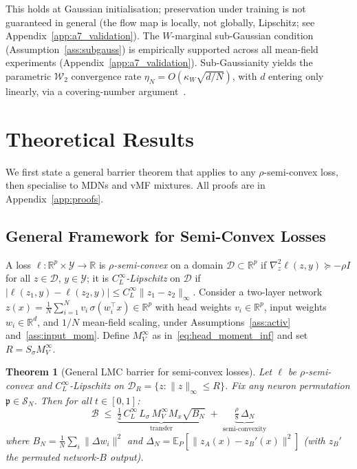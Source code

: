 \documentclass[11pt]{article}
\newtheorem{theorem}{Theorem}[section]
\newcommand{\R}{\mathbb{R}}
\newcommand{\E}{\mathbb{E}}
\newcommand{\cW}{\mathcal{W}}
\newcommand{\cS}{\mathcal{S}}
\newcommand{\cB}{\mathcal{B}}
\newcommand{\cD}{\mathcal{D}}  %
\newcommand{\cY}{\mathcal{Y}}
\newcommand{\nperm}{\mathfrak{p}}  %
\begin{document}
This holds at Gaussian initialisation; preservation under training
is not guaranteed in general (the flow map is locally, not globally,
Lipschitz; see Appendix~\ref{app:a7_validation}).
The $W$-marginal sub-Gaussian condition (Assumption~\ref{ass:subgauss})
is empirically supported across all mean-field experiments
(Appendix~\ref{app:a7_validation}).
Sub-Gaussianity yields the parametric $\cW_2$ convergence rate
$\eta_N = O(\kappa_W\sqrt{d/N})$, with $d$ entering only linearly,
via a covering-number argument~\cite{lei2020,weed2019}.

\section{Theoretical Results}\label{sec:loss_geometry}

We first state a general barrier theorem that applies to any
$\rho$-semi-convex loss, then specialise to MDNs and vMF mixtures.
All proofs are in Appendix~\ref{app:proofs}.

\subsection{General Framework for Semi-Convex Losses}
\label{sec:general_framework}

A loss $\ell:\R^p \times \cY \to \R$ is \emph{$\rho$-semi-convex}
on a domain $\cD \subset \R^p$ if
$\nabla^2_z \ell(z,y) \succeq -\rho I$ for all $z \in \cD$,
$y \in \cY$; it is \emph{$C_L^\infty$-Lipschitz} on $\cD$ if
$|\ell(z_1,y)-\ell(z_2,y)| \le C_L^\infty \|z_1-z_2\|_\infty$.
Consider a two-layer network
$z(x)=\frac{1}{N}\sum_{i=1}^N v_i\,\sigma(w_i^\top x)\in\R^p$
with head weights $v_i\in\R^p$, input weights $w_i\in\R^d$, and
$1/N$ mean-field scaling,
under Assumptions~\ref{ass:activ} and~\ref{ass:input_mom}.
Define $M_V^\infty$ as in~\eqref{eq:head_moment_inf}
and set $R=S_\sigma M_V^\infty$.

\begin{theorem}[General LMC barrier for semi-convex losses]
\label{thm:general}
Let $\ell$ be $\rho$-semi-convex and $C_L^\infty$-Lipschitz on
$\cD_R = \{z:\|z\|_\infty \le R\}$.
Fix any neuron permutation $\nperm \in \cS_N$.
Then for all $t\in[0,1]$:
\begin{equation}\label{eq:general_bound}
  \boxed{
  \cB \;\le\;
  \underbrace{\tfrac{1}{2}\,C_L^\infty\,L_\sigma\,M_V^\infty
    M_x\sqrt{B_N}}_{\text{transfer}}
  \;+\;
  \underbrace{\tfrac{\rho}{8}\,\Delta_N}_{\text{semi-convexity}}
  }
\end{equation}
where $B_N = \frac{1}{N}\sum_i\|\Delta w_i\|^2$ and
$\Delta_N = \E_P[\|z_A(x)-z_B'(x)\|^2]$
(with $z_B'$ the permuted network-$B$ output).
\end{theorem}
\end{document}
